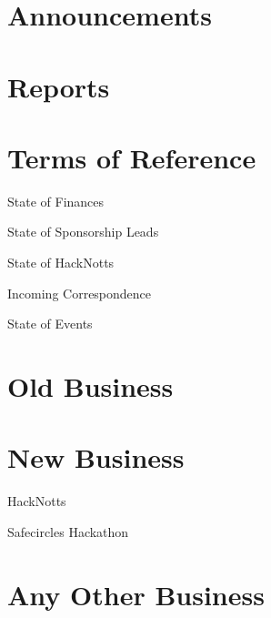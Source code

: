 \documentclass[11pt,hacksoc,agenda]{meetingmins}
\begin{document}
\maketitle

\section{Announcements}
\begin{items}
\item
\end{items}

\section{Reports}

\section{Terms of Reference}
\begin{items}
\item {State of Finances}
\item {State of Sponsorship Leads}
\item {State of HackNotts}
\item {Incoming Correspondence}
\item {State of Events}
\end{items}

\section{Old Business}
\begin{items}
\item
\end{items}

\section{New Business}
\begin{items}
\item {HackNotts}
\item {Safecircles Hackathon}
\end{items}

\section{Any Other Business}

\vspace{1em}
\end{document}
